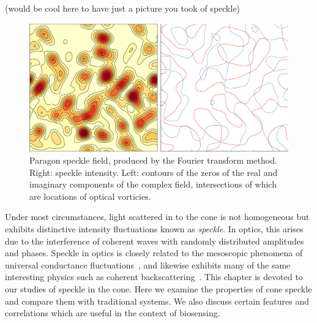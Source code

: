 (would be cool here to have just a picture you took of speckle)
\begin{figure}[ht]
\centering
\includegraphics[keepaspectratio,width=15cm]{speckle/figures/introfig.pdf}
\caption{Paragon speckle field, produced by the Fourier transform method.
								Right: speckle intensity.  Left: contours of the zeros of the real
								and imaginary components of the complex field, intersections of
								which are locations of optical vorticies.}
\label{fig:examplespeckle}
\end{figure}

Under most circumstances, light scattered in to the cone is not homogeneous
but exhibits distinctive intensity fluctuations known as \textit{speckle}.
In optics, this arises due to the interference of coherent waves with
randomly distributed amplitudes and phases.  Speckle in optics is closely
related to the mesoscopic phenomena of universal conductance
fluctuations~\cite{lee1985universal}, and likewise exhibits many of the
same interesting physics such as coherent
backscattering~\cite{akkermans1986coherent}.  This chapter is devoted to
our studies of speckle in the cone.  Here we examine the properties of cone
speckle and compare them with traditional systems.  We also discuss certain
features and correlations which are useful in the context of biosensing.
